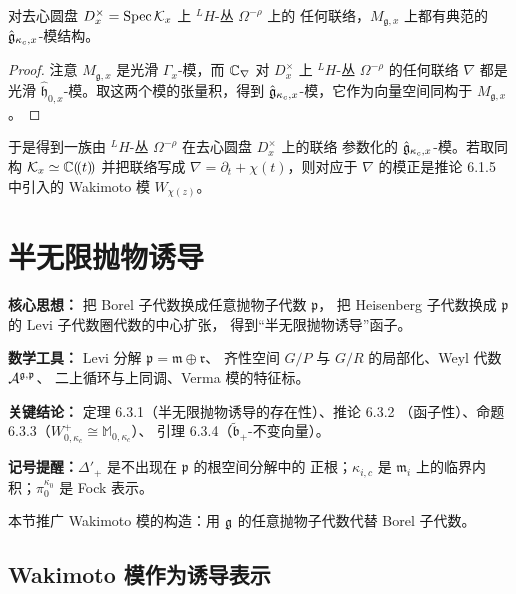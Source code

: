 \renewcommand{\theproposition}{6.2.5}
\begin{proposition}
    对去心圆盘 $D^\times_x=\operatorname{Spec}\mathcal{K}_x$ 上 $^LH$-丛 $\Omega^{-\rho}$ 上的
    任何联络，$M_{\mathfrak g,x}$ 上都有典范的
    $\hat{\mathfrak{g}}_{\kappa_c,x}$-模结构。
\end{proposition}

\begin{proof}
    注意 $M_{\mathfrak g,x}$ 是光滑 $\Gamma_x$-模，而 $\mathbb{C}_\nabla$ 对
    $D^\times_x$ 上 $^LH$-丛 $\Omega^{-\rho}$ 的任何联络 $\nabla$ 都是光滑
    $\widehat{\mathfrak h}_{0,x}$-模。取这两个模的张量积，得到
    $\hat{\mathfrak{g}}_{\kappa_c,x}$-模，它作为向量空间同构于 $M_{\mathfrak g,x}$。
\end{proof}

于是得到一族由 $^LH$-丛 $\Omega^{-\rho}$ 在去心圆盘 $D^\times_x$ 上的联络
参数化的 $\hat{\mathfrak{g}}_{\kappa_c,x}$-模。若取同构
$\mathcal{K}_x\simeq\mathbb{C}(\!(t)\!)$ 并把联络写成
$\nabla=\partial_t+\chi(t)$，则对应于 $\nabla$ 的模正是推论 6.1.5 中引入的
Wakimoto 模 $W_{\chi(z)}$。

\section{半无限抛物诱导}

\setcounter{theorem}{0}

\begin{keypoints}
    \item \textbf{核心思想：} 把 Borel 子代数换成任意抛物子代数 $\mathfrak p$，
    把 Heisenberg 子代数换成 $\mathfrak p$ 的 Levi 子代数圈代数的中心扩张，
    得到“半无限抛物诱导”函子。
    \item \textbf{数学工具：} Levi 分解 $\mathfrak p=\mathfrak m\oplus\mathfrak r$、
    齐性空间 $G/P$ 与 $G/R$ 的局部化、Weyl 代数 $\mathcal{A}^{\mathfrak g,\mathfrak p}$、
    二上循环与上同调、Verma 模的特征标。
    \item \textbf{关键结论：} 定理 6.3.1（半无限抛物诱导的存在性）、推论 6.3.2
    （函子性）、命题 6.3.3（$W^+_{0,\kappa_c}\cong\mathbb M_{0,\kappa_c}$）、
    引理 6.3.4（$\widetilde{\mathfrak b}_+$-不变向量）。
    \item \textbf{记号提醒：}$\Delta'_+$ 是不出现在 $\mathfrak p$ 的根空间分解中的
    正根；$\kappa_{i,c}$ 是 $\mathfrak m_i$ 上的临界内积；$\pi^{\kappa_0}_0$ 是
    Fock 表示。
\end{keypoints}

本节推广 Wakimoto 模的构造：用 $\mathfrak{g}$ 的任意抛物子代数代替 Borel 子代数。

\subsection{Wakimoto 模作为诱导表示}

